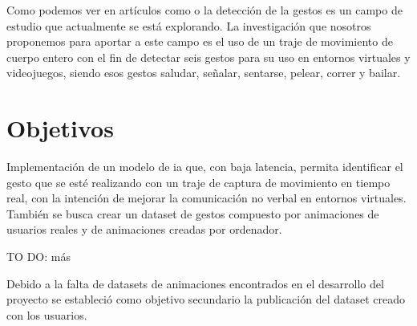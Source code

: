 
Como podemos ver en artículos como \cite{Neverova} o \cite{VRHANDS} la detección de la gestos es un campo de estudio que actualmente se está explorando.
La investigación que nosotros proponemos para aportar a este campo es el uso de un traje de movimiento de cuerpo entero con el fin de detectar seis gestos para su uso en entornos virtuales y videojuegos, siendo esos gestos saludar, señalar, sentarse, pelear, correr y bailar.

\section{Objetivos}
Implementación de un modelo de \gls{ia} que, con baja latencia, permita identificar el gesto que se esté realizando con un traje de captura de movimiento en tiempo real, con  la intención de mejorar la comunicación no verbal en entornos virtuales. También se busca crear un dataset de gestos compuesto por animaciones de usuarios reales y de animaciones creadas por ordenador.

TO DO: más

Debido a la falta de datasets de animaciones encontrados en el desarrollo del proyecto se estableció como objetivo secundario la publicación del dataset creado con los usuarios.

